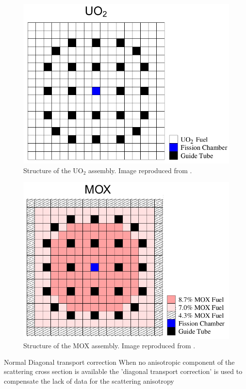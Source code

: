 \documentclass{anstrans}
\begin{document}
\begin{figure}[htbp!] %
    \centering
    \includegraphics[width=0.95\linewidth]{figures/bench-config2.png}
    \hfill
    \caption{Structure of the UO$_2$ assembly. Image reproduced from \cite{capilla_applications_2009}.}
    \label{fig:bench2}
\end{figure}

\begin{figure}[htbp!] %
    \centering
    \includegraphics[width=0.95\linewidth]{figures/bench-config3.png}
    \hfill
    \caption{Structure of the MOX assembly. Image reproduced from \cite{capilla_applications_2009}.}
    \label{fig:bench3}
\end{figure}

Normal \cite{capilla_applications_2009}
Diagonal transport correction \cite{cavarec_benchmark_1994}
When no anisotropic component of the scattering cross section is available the 'diagonal transport correction' is used to compensate the lack of data for the scattering anisotropy \cite{cavarec_benchmark_1994}
\end{document}
